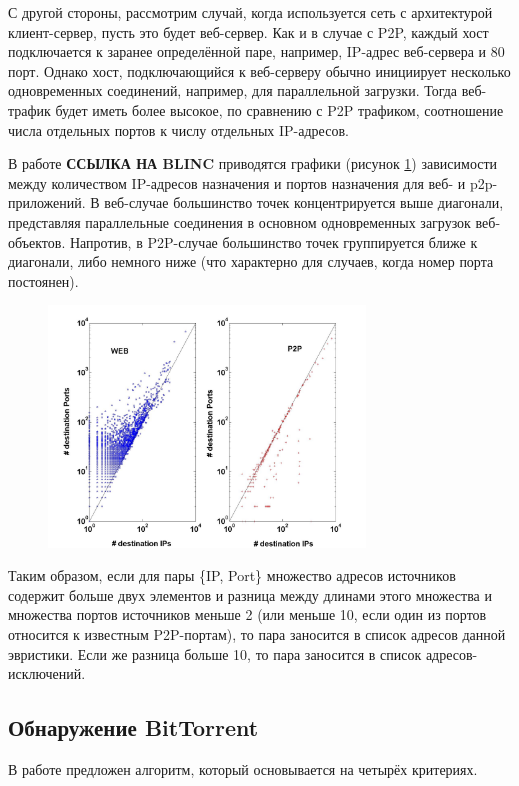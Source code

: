 \documentclass[bachelor, och, coursework]{SCWorks}
\begin{document}
С другой стороны, рассмотрим случай, когда используется сеть с архитектурой клиент-сервер, пусть это будет веб-сервер. Как и в случае с P2P, каждый хост подключается к заранее определённой паре, например, IP-адрес веб-сервера и 80 порт. Однако хост, подключающийся к веб-серверу обычно инициирует несколько одновременных соединений, например, для параллельной загрузки. Тогда веб-трафик будет иметь более высокое, по сравнению с P2P трафиком, соотношение числа отдельных портов к числу отдельных IP-адресов.

В работе \textbf{ССЫЛКА НА BLINC} приводятся графики (рисунок \ref{IPPort4.jpg}) зависимости между количеством IP-адресов назначения и портов назначения для веб- и p2p-приложений. В веб-случае большинство точек концентрируется выше диагонали, представляя параллельные соединения в основном одновременных загрузок веб-объектов. Напротив, в P2P-случае большинство точек группируется ближе к диагонали, либо немного ниже (что характерно для случаев, когда номер порта постоянен).

\begin{figure}[H]
    \centering
    \includegraphics[width=0.75\textwidth]{IPPort4.jpg}
    \caption{}
    \label{IPPort4.jpg}
\end{figure}

Таким образом, если для пары \{IP, Port\} множество адресов источников содержит больше двух элементов и разница между длинами этого множества и множества портов источников меньше 2 (или меньше 10, если один из портов относится к известным P2P-портам), то пара заносится в список адресов данной эвристики. Если же разница больше 10, то пара заносится в список адресов-исключений. 

\subsection{Обнаружение BitTorrent}
В работе \cite{BitTorrent} предложен алгоритм, который основывается на четырёх критериях.
\end{document}
